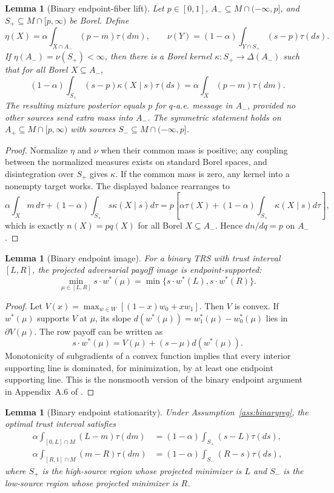 \documentclass[11pt]{article}
\newtheorem{lemma}[theorem]{Lemma}
\theoremstyle{definition}
\theoremstyle{remark}
\begin{document}
\begin{lemma}[Binary endpoint-fiber lift]\label{lem:B1}
Let $p\in[0,1]$, $A_-\subseteq M\cap(-\infty,p]$, and $S_+\subseteq M\cap[p,\infty)$ be Borel. Define
\[
  \eta(X)=\alpha\int_{X\cap A_-}(p-m)\tau(dm),
  \qquad
  \nu(Y)=(1-\alpha)\int_{Y\cap S_+}(s-p)\tau(ds).
\]
If $\eta(A_-)=\nu(S_+)<\infty$, then there is a Borel kernel $\kappa:S_+\to\Delta(A_-)$ such that for all Borel $X\subseteq A_-$,
\[
  (1-\alpha)\int_{S_+}(s-p)\kappa(X\mid s)\tau(ds)
  =\alpha\int_X(p-m)\tau(dm).
\]
The resulting mixture posterior equals $p$ for $q$-a.e. message in $A_-$, provided no other sources send extra mass into $A_-$. The symmetric statement holds on $A_+\subseteq M\cap[p,\infty)$ with sources $S_-\subseteq M\cap(-\infty,p]$.
\end{lemma}

\begin{proof}
Normalize $\eta$ and $\nu$ when their common mass is positive; any coupling between the normalized measures exists on standard Borel spaces, and disintegration over $S_+$ gives $\kappa$. If the common mass is zero, any kernel into a nonempty target works. The displayed balance rearranges to
\[
  \alpha\int_X m\,d\tau +(1-\alpha)\int_{S_+}s\kappa(X\mid s)d\tau
  = p\left[\alpha\tau(X)+(1-\alpha)\int_{S_+}\kappa(X\mid s)d\tau\right],
\]
which is exactly $n(X)=p q(X)$ for all Borel $X\subseteq A_-$. Hence $dn/dq=p$ on $A_-$.
\end{proof}

\begin{lemma}[Binary endpoint image]\label{lem:binaryimage}
For a binary TRS with trust interval $[L,R]$, the projected adversarial payoff image is endpoint-supported:
\[
  \min_{\mu\in[L,R]}s\cdot w^*(\mu)
  =\min\{s\cdot w^*(L),s\cdot w^*(R)\}.
\]
\end{lemma}

\begin{proof}
Let $V(x)=\max_{w\in W}[(1-x)w_0+xw_1]$. Then $V$ is convex. If $w^*(\mu)$ supports $V$ at $\mu$, its slope $d(w^*(\mu))=w_1^*(\mu)-w_0^*(\mu)$ lies in $\partial V(\mu)$. The row payoff can be written as
\[
  s\cdot w^*(\mu)=V(\mu)+(s-\mu)d(w^*(\mu)).
\]
Monotonicity of subgradients of a convex function implies that every interior supporting line is dominated, for minimization, by at least one endpoint supporting line. This is the nonsmooth version of the binary endpoint argument in Appendix~A.6 of \cite{DworczakSmolin2026}.
\end{proof}

\begin{lemma}[Binary endpoint stationarity]\label{lem:binarystat}
Under Assumption~\ref{ass:binaryreg}, the optimal trust interval satisfies
\begin{align}
  \alpha\int_{[0,L]\cap M}(L-m)\tau(dm)
  &= (1-\alpha)\int_{S_+}(s-L)\tau(ds),\label{eq:leftbalance}\\
  \alpha\int_{[R,1]\cap M}(m-R)\tau(dm)
  &= (1-\alpha)\int_{S_-}(R-s)\tau(ds),\label{eq:rightbalance}
\end{align}
where $S_+$ is the high-source region whose projected minimizer is $L$ and $S_-$ is the low-source region whose projected minimizer is $R$.
\end{lemma}
\end{document}
